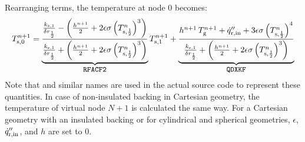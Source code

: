 Rearranging terms, the temperature at node 0 becomes:
\begin{equation}
\label{T0}
  T_{\rm s,0}^{n+1} = \underbrace{\frac{\frac{k_{\rm s,1}}{\delta r_{\frac{1}{2}}}- \left(\frac{h^{n+1}}{2} + 2 \epsilon \sigma \left(T_{\rm s,\frac{1}{2}}^n\right)^3 \right)}{\frac{k_{\rm s,1}}{\delta r_{\frac{1}{2}}} + \left(\frac{h^{n+1}}{2} + 2 \epsilon \sigma \left( T_{\rm s,\frac{1}{2}}^n\right)^3 \right)}}_{\texttt{\small RFACF2}} T_{\rm s,1}^{n+1} +
 \underbrace{ \frac{  h^{n+1} \, T_{\rm g}^{n+1} + \dot{q}_{\rm r,in}'' + 3 \epsilon \sigma \left( T_{\rm s,\frac{1}{2}}^n\right)^4 }{\frac{k_{\rm s,1}}{\delta r_{\frac{1}{2}}}+\left(\frac{h^{n+1}}{2} + 2 \epsilon \sigma \left( T_{\rm s,\frac{1}{2}}^n\right)^3 \right)} }_{\texttt{\small QDXKF}}
\end{equation}
Note that  and similar names are used in the actual source code to represent these quantities.
In case of non-insulated backing in Cartesian geometry, the temperature of virtual node $N+1$ is calculated the same way.
For a Cartesian geometry with an insulated backing or for cylindrical and spherical geometries, $\epsilon$, $\dot{q}_{\rm r,in}''$, and $h$ are set to 0.

